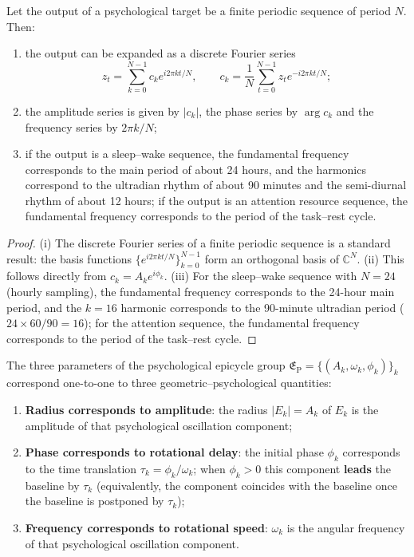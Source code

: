 \begin{theorem}\label{thm:psych_series_reconstruction}
Let the output of a psychological target be a finite periodic sequence of period $N$. Then:
\begin{enumerate}[label=(\roman*)]
    \item the output can be expanded as a discrete Fourier series
    \[
    z_t=\sum_{k=0}^{N-1}c_k e^{i2\pi kt/N},\qquad
    c_k=\frac1N\sum_{t=0}^{N-1}z_t e^{-i2\pi kt/N};
    \]
    \item the amplitude series is given by $|c_k|$, the phase series by $\arg c_k$ and the frequency series by $2\pi k/N$;
    \item if the output is a sleep--wake sequence, the fundamental frequency corresponds to the main period of about 24 hours, and the harmonics correspond to the ultradian rhythm of about 90 minutes and the semi-diurnal rhythm of about 12 hours; if the output is an attention resource sequence, the fundamental frequency corresponds to the period of the task--rest cycle.
\end{enumerate}
\end{theorem}

\begin{proof}
(i) The discrete Fourier series of a finite periodic sequence is a standard result: the basis functions $\{e^{i2\pi kt/N}\}_{k=0}^{N-1}$ form an orthogonal basis of $\mathbb C^N$.
(ii) This follows directly from $c_k=A_k e^{i\phi_k}$.
(iii) For the sleep--wake sequence with $N=24$ (hourly sampling), the fundamental frequency corresponds to the 24-hour main period, and the $k=16$ harmonic corresponds to the 90-minute ultradian period ($24\times 60/90=16$); for the attention sequence, the fundamental frequency corresponds to the period of the task--rest cycle.
\end{proof}

\begin{proposition}\label{prop:psych_epicycle_correspondence}
The three parameters of the psychological epicycle group $\mathfrak E_{\mathrm{P}}=\{(A_k,\omega_k,\phi_k)\}_{k}$ correspond one-to-one to three geometric--psychological quantities:
\begin{enumerate}[label=(\roman*)]
    \item \textbf{Radius corresponds to amplitude}: the radius $|E_k|=A_k$ of $E_k$ is the amplitude of that psychological oscillation component;
    \item \textbf{Phase corresponds to rotational delay}: the initial phase $\phi_k$ corresponds to the time translation $\tau_k=\phi_k/\omega_k$; when $\phi_k>0$ this component \textbf{leads} the baseline by $\tau_k$ (equivalently, the component coincides with the baseline once the baseline is postponed by $\tau_k$);
    \item \textbf{Frequency corresponds to rotational speed}: $\omega_k$ is the angular frequency of that psychological oscillation component.
\end{enumerate}
\end{proposition}

